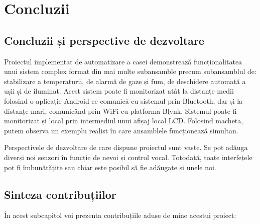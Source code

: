 \chapter{Concluzii}
\thispagestyle{pagestyle}

\section{Concluzii și perspective de dezvoltare}
Proiectul implementat de automatizare a casei demonstrează funcționalitatea unui sistem complex format din mai multe subansamble precum subansamblul de: stabilizare a temperaturii, de alarmă de gaze și fum, de deschidere automată a ușii și de iluminat. Acest sistem poate fi monitorizat atât la distanțe medii folosind o aplicație Android ce comunică cu sistemul prin Bluetooth, dar și la distanțe mari, comunicând prin WiFi cu platforma Blynk. Sistemul poate fi monitorizat și local prin intermediul unui afișaj local LCD. Folosind macheta, putem observa un exemplu realist în care ansamblele funcționează simultan. 

Perspectivele de dezvoltare de care dispune proiectul sunt vaste. Se pot adăuga diverși noi senzori în funcție de nevoi și control vocal. Totodată, toate interfețele pot fi îmbunătățite sau chiar este posibil să fie adăugate și unele noi.

\section{Sinteza contribuțiilor}

În acest subcapitol voi prezenta contribuțiile aduse de mine acestui proiect:

